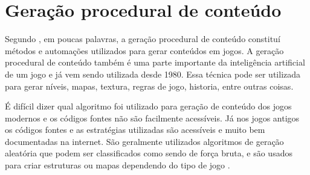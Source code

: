 \section{Geração procedural de conteúdo}

Segundo \space{}, em poucas palavras, a geração procedural de conteúdo constituí métodos e automações utilizados para gerar conteúdos em jogos. A geração procedural de conteúdo também é uma parte importante da inteligência artificial de um jogo e já vem sendo utilizada desde 1980.
Essa técnica pode ser utilizada para gerar níveis, mapas, textura, regras de jogo, historia, entre outras coisas.

É difícil dizer qual algoritmo foi utilizado para geração de conteúdo dos jogos modernos e os códigos fontes não são facilmente acessíveis. Já nos jogos antigos os códigos fontes e as estratégias utilizadas são acessíveis e muito bem documentadas na internet. São geralmente utilizados algoritmos de geração aleatória que podem ser classificados como sendo de força bruta, e são usados para criar estruturas ou mapas dependendo do tipo de jogo \space\cite{dormans2010adventures}.
